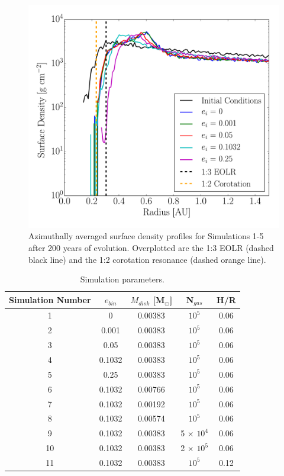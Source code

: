 \begin{figure}
	\includegraphics[width=\columnwidth]{f1}
    \caption{Azimuthally averaged surface density profiles for Simulations 1-5 after 200 years of evolution.  Overplotted are the 1:3 EOLR (dashed black line) and the 1:2 corotation resonance (dashed orange line).}
    \label{fig:CBDiskSurfaceDensity}
\end{figure}

\begin{table}
	\centering
	\caption{Simulation parameters.}
	\begin{tabular}{ccccc} %
		\hline
		Simulation Number & $e_{bin}$ & $M_{disk}$ [M$_{\odot}$] & N$_{gas}$ & H/R \\
		\hline
		1 & 0 & 0.00383 & $10^5$ & 0.06 \\
		2 & 0.001 & 0.00383 & $10^5$ & 0.06 \\
		3 & 0.05 & 0.00383 & $10^5$ & 0.06 \\
		4 & 0.1032 & 0.00383 & $10^5$ & 0.06 \\
		5 & 0.25 & 0.00383 & $10^5$ & 0.06 \\ 
		6 & 0.1032 & 0.00766 & $10^5$ & 0.06 \\
		7 & 0.1032 & 0.00192 & $10^5$ & 0.06 \\
		8 & 0.1032 & 0.00574 & $10^5$ & 0.06 \\
		9 & 0.1032 & 0.00383 & 5 $\times$ $10^4$ & 0.06 \\
		10 & 0.1032 & 0.00383 & 2 $\times$ $10^5$ & 0.06 \\
		11 & 0.1032 & 0.00383 & $10^5$ & 0.12 \\
		\hline
	\end{tabular}
	\label{tab:CBDisk_table_2}
\end{table}

